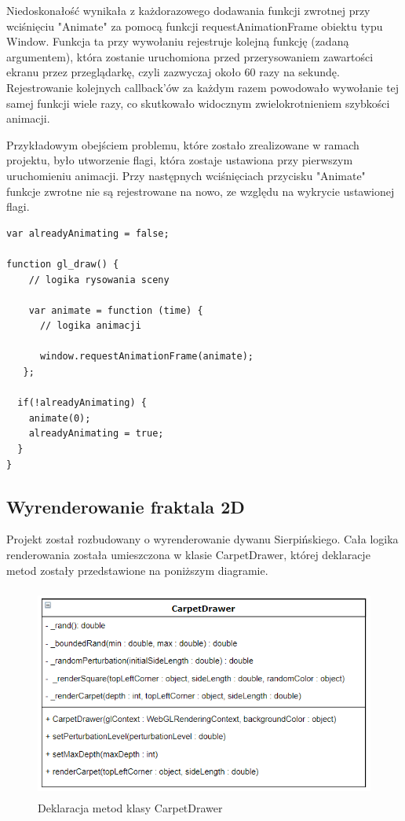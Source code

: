 \documentclass[a4paper,11pt]{article}
\begin{document}
Niedoskonałość wynikała z każdorazowego dodawania funkcji zwrotnej przy wciśnięciu "Animate" za pomocą funkcji requestAnimationFrame obiektu typu Window. Funkcja ta przy wywołaniu rejestruje kolejną funkcję (zadaną argumentem), która zostanie uruchomiona przed przerysowaniem zawartości ekranu przez przeglądarkę, czyli zazwyczaj około 60 razy na sekundę.  Rejestrowanie kolejnych callback'ów za każdym razem powodowało wywołanie tej samej funkcji wiele razy, co skutkowało widocznym zwielokrotnieniem szybkości animacji.

Przykładowym obejściem problemu, które zostało zrealizowane w ramach projektu, było utworzenie flagi, która zostaje ustawiona przy pierwszym uruchomieniu animacji. Przy następnych wciśnięciach przycisku "Animate" funkcje zwrotne nie są rejestrowane na nowo, ze względu na wykrycie ustawionej flagi.


\begin{lstlisting}[caption=Realizacja obejścia problemu przyśpieszania animacji]
var alreadyAnimating = false;

function gl_draw() {
    // logika rysowania sceny 

    var animate = function (time) {
      // logika animacji

      window.requestAnimationFrame(animate);
   };

  if(!alreadyAnimating) {
    animate(0);
    alreadyAnimating = true;
  }
}
\end{lstlisting}


\subsection{Wyrenderowanie fraktala 2D}

Projekt został rozbudowany o wyrenderowanie dywanu Sierpińskiego. Cała logika renderowania została umieszczona w klasie CarpetDrawer, której deklaracje metod zostały przedstawione na poniższym diagramie.

\begin{figure}[H]
\centering
 \includegraphics[height=7cm]{uml.PNG}
\caption{Deklaracja metod klasy CarpetDrawer}
\end{figure}
\end{document}
